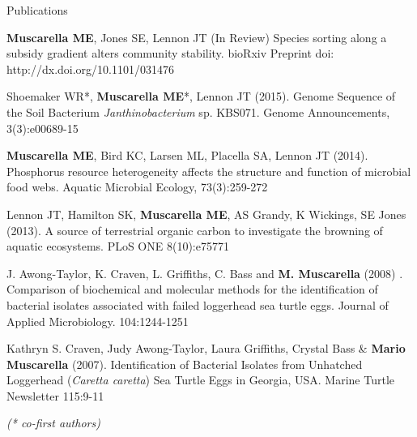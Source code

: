 \documentclass{resume} %
\begin{document}

\begin{rSection}{Publications}

{\bf Muscarella ME}, Jones SE, Lennon JT (In Review) Species sorting along a
subsidy gradient alters community stability. bioRxiv Preprint
doi: http://dx.doi.org/10.1101/031476

Shoemaker WR*, {\bf Muscarella ME}*, Lennon JT (2015). Genome Sequence of the
Soil Bacterium {\em Janthinobacterium} sp. KBS071. Genome Announcements,
3(3):e00689-15

{\bf Muscarella ME}, Bird KC, Larsen ML, Placella SA, Lennon JT (2014).
Phosphorus resource heterogeneity affects the structure and function of
microbial food webs. Aquatic Microbial Ecology, 73(3):259-272

Lennon JT, Hamilton SK, {\bf Muscarella ME}, AS Grandy, K Wickings, SE Jones
(2013). A source of terrestrial organic carbon to investigate the browning of
aquatic ecosystems. PLoS ONE 8(10):e75771

J. Awong-Taylor, K. Craven, L. Griffiths, C. Bass and {\bf M. Muscarella} (2008)
. Comparison of biochemical and molecular methods for the identification of
bacterial isolates associated with failed loggerhead sea turtle eggs. Journal of
Applied Microbiology. 104:1244-1251

Kathryn S. Craven, Judy Awong-Taylor, Laura Griffiths, Crystal Bass \&
{\bf Mario Muscarella} (2007). Identification of Bacterial Isolates from
Unhatched Loggerhead ({\em Caretta caretta}) Sea Turtle Eggs in Georgia, USA.
Marine Turtle Newsletter 115:9-11

{\em (* co-first authors)}

\end{rSection}

\end{document}
